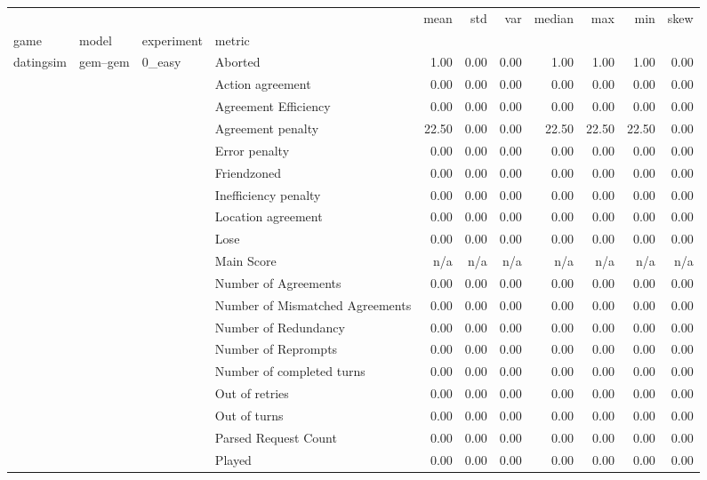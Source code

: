 \begin{tabular}{llllrrrrrrr}
\toprule
 &  &  &  & mean & std & var & median & max & min & skew \\
game & model & experiment & metric &  &  &  &  &  &  &  \\
\midrule
\multirow[t]{1512}{*}{datingsim} & \multirow[t]{216}{*}{gem--gem} & \multirow[t]{27}{*}{0_easy} & Aborted & 1.00 & 0.00 & 0.00 & 1.00 & 1.00 & 1.00 & 0.00 \\
 &  &  & Action agreement & 0.00 & 0.00 & 0.00 & 0.00 & 0.00 & 0.00 & 0.00 \\
 &  &  & Agreement Efficiency & 0.00 & 0.00 & 0.00 & 0.00 & 0.00 & 0.00 & 0.00 \\
 &  &  & Agreement penalty & 22.50 & 0.00 & 0.00 & 22.50 & 22.50 & 22.50 & 0.00 \\
 &  &  & Error penalty & 0.00 & 0.00 & 0.00 & 0.00 & 0.00 & 0.00 & 0.00 \\
 &  &  & Friendzoned & 0.00 & 0.00 & 0.00 & 0.00 & 0.00 & 0.00 & 0.00 \\
 &  &  & Inefficiency penalty & 0.00 & 0.00 & 0.00 & 0.00 & 0.00 & 0.00 & 0.00 \\
 &  &  & Location agreement & 0.00 & 0.00 & 0.00 & 0.00 & 0.00 & 0.00 & 0.00 \\
 &  &  & Lose & 0.00 & 0.00 & 0.00 & 0.00 & 0.00 & 0.00 & 0.00 \\
 &  &  & Main Score & n/a & n/a & n/a & n/a & n/a & n/a & n/a \\
 &  &  & Number of Agreements & 0.00 & 0.00 & 0.00 & 0.00 & 0.00 & 0.00 & 0.00 \\
 &  &  & Number of Mismatched Agreements & 0.00 & 0.00 & 0.00 & 0.00 & 0.00 & 0.00 & 0.00 \\
 &  &  & Number of Redundancy & 0.00 & 0.00 & 0.00 & 0.00 & 0.00 & 0.00 & 0.00 \\
 &  &  & Number of Reprompts & 0.00 & 0.00 & 0.00 & 0.00 & 0.00 & 0.00 & 0.00 \\
 &  &  & Number of completed turns & 0.00 & 0.00 & 0.00 & 0.00 & 0.00 & 0.00 & 0.00 \\
 &  &  & Out of retries & 0.00 & 0.00 & 0.00 & 0.00 & 0.00 & 0.00 & 0.00 \\
 &  &  & Out of turns & 0.00 & 0.00 & 0.00 & 0.00 & 0.00 & 0.00 & 0.00 \\
 &  &  & Parsed Request Count & 0.00 & 0.00 & 0.00 & 0.00 & 0.00 & 0.00 & 0.00 \\
 &  &  & Played & 0.00 & 0.00 & 0.00 & 0.00 & 0.00 & 0.00 & 0.00 \\

\end{tabular}
